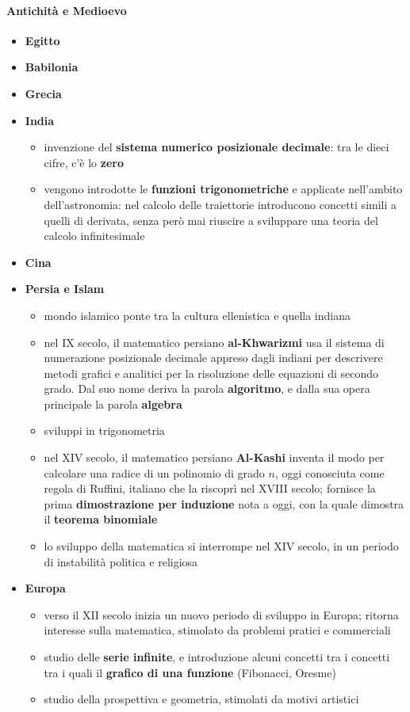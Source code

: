 \paragraph{Antichità e Medioevo}
\begin{itemize}
  \item \textbf{Egitto}
  \item \textbf{Babilonia}
  \item \textbf{Grecia}
  \item \textbf{India}
      \begin{itemize}
          \item invenzione del \textbf{sistema numerico posizionale decimale}: tra le dieci cifre, c'è lo \textbf{zero}
          \item vengono introdotte le \textbf{funzioni trigonometriche} e applicate nell'ambito dell'astronomia: nel calcolo delle traiettorie introducono concetti simili a quelli di derivata, senza però mai riuscire a sviluppare una teoria del calcolo infinitesimale
      \end{itemize}
  \item \textbf{Cina}
  \item \textbf{Persia e Islam}
      \begin{itemize}
          \item mondo islamico ponte tra la cultura ellenistica e quella indiana
          \item nel IX secolo, il matematico persiano \textbf{al-Khwarizmi} usa il sistema di numerazione posizionale decimale appreso dagli indiani per descrivere metodi grafici e analitici per la risoluzione delle equazioni di secondo grado. Dal suo nome deriva la parola \textbf{algoritmo}, e dalla sua opera principale la parola \textbf{algebra}
          \item sviluppi in trigonometria
          \item nel XIV secolo, il matematico persiano \textbf{Al-Kashi} inventa il modo per calcolare una radice di un polinomio di grado $n$, oggi conosciuta come regola di Ruffini, italiano che la riscoprì nel XVIII secolo; fornisce la prima \textbf{dimostrazione per induzione} nota a oggi, con la quale dimostra il \textbf{teorema binomiale}
          \item lo sviluppo della matematica si interrompe nel XIV secolo, in un periodo di instabilità politica e religiosa
      \end{itemize}
  \item \textbf{Europa}
      \begin{itemize}
          \item verso il XII secolo inizia un nuovo periodo di sviluppo in Europa; ritorna interesse sulla matematica, stimolato da problemi pratici e commerciali
          \item studio delle \textbf{serie infinite}, e introduzione alcuni concetti tra i concetti tra i quali il \textbf{grafico di una funzione} (Fibonacci, Oresme)
          \item studio della prospettiva e geometria, stimolati da motivi artistici
      \end{itemize}
\end{itemize}
